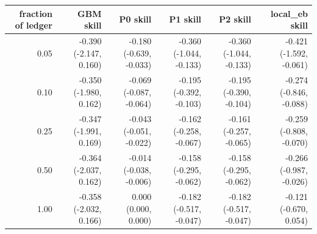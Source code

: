 \begin{tabular}{rrrrrr}
\toprule
fraction of ledger & GBM skill & P0 skill & P1 skill & P2 skill & local\_eb skill \\
\midrule
0.05 & -0.390 (-2.147, 0.160) & -0.180 (-0.639, -0.033) & -0.360 (-1.044, -0.133) & -0.360 (-1.044, -0.133) & -0.421 (-1.592, -0.061) \\
0.10 & -0.350 (-1.980, 0.162) & -0.069 (-0.087, -0.064) & -0.195 (-0.392, -0.103) & -0.195 (-0.390, -0.104) & -0.274 (-0.846, -0.088) \\
0.25 & -0.347 (-1.991, 0.169) & -0.043 (-0.051, -0.022) & -0.162 (-0.258, -0.067) & -0.161 (-0.257, -0.065) & -0.259 (-0.808, -0.070) \\
0.50 & -0.364 (-2.037, 0.162) & -0.014 (-0.038, -0.006) & -0.158 (-0.295, -0.062) & -0.158 (-0.295, -0.062) & -0.266 (-0.987, -0.026) \\
1.00 & -0.358 (-2.032, 0.166) & 0.000 (0.000, 0.000) & -0.182 (-0.517, -0.047) & -0.182 (-0.517, -0.047) & -0.121 (-0.670, 0.054) \\
\bottomrule
\end{tabular}
